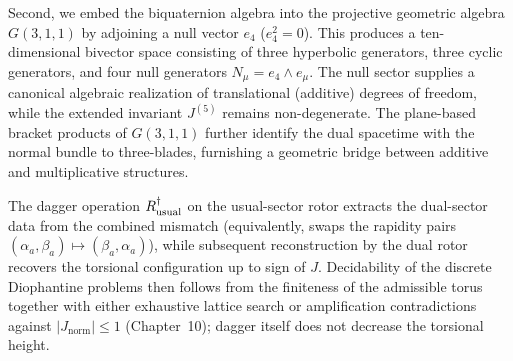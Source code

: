 \documentclass[a4paper]{article}
\theoremstyle{definition}
\theoremstyle{remark}
\newcommand{\Jnorm}{J_{\mathrm{norm}}}
\begin{document}
Second, we embed the biquaternion algebra into the projective geometric algebra \(G(3,1,1)\) by adjoining a null vector \(e_4\) (\(e_4^2 = 0\)). This produces a ten-dimensional bivector space consisting of three hyperbolic generators, three cyclic generators, and four null generators \(N_\mu = e_4 \wedge e_\mu\). The null sector supplies a canonical algebraic realization of translational (additive) degrees of freedom, while the extended invariant \(J^{(5)}\) remains non-degenerate. The plane-based bracket products of \(G(3,1,1)\) further identify the dual spacetime with the normal bundle to three-blades, furnishing a geometric bridge between additive and multiplicative structures.

The dagger operation \(R_{\rm usual}^\dagger\) on the usual-sector rotor extracts the dual-sector data from the combined mismatch (equivalently, swaps the rapidity pairs \((\alpha_a,\beta_a)\mapsto(\beta_a,\alpha_a)\)), while subsequent reconstruction by the dual rotor recovers the torsional configuration up to sign of \(J\). Decidability of the discrete Diophantine problems then follows from the finiteness of the admissible torus together with either exhaustive lattice search or amplification contradictions against \(|\Jnorm|\le 1\) (Chapter~10); dagger itself does not decrease the torsional height.
\end{document}
